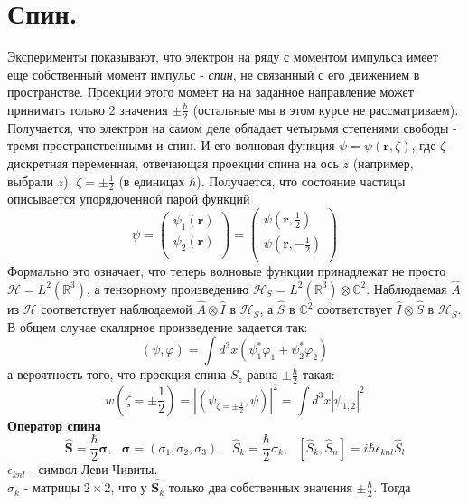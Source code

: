 \section{Спин.}
	Эксперименты показывают, что электрон на ряду с моментом импульса имеет еще собственный момент импульс - \textit{спин}, не связанный с его движением в пространстве. Проекции этого момент на на заданное направление может принимать только 2 значения $\pm\frac{\hbar}{2}$ (остальные мы в этом курсе не рассматриваем). \\
	Получается, что электрон на самом деле обладает четырьмя степенями свободы - тремя пространственными и спин. И его волновая функция $\psi = \psi(\textbf{r}, \zeta)$, где $\zeta$ - дискретная переменная, отвечающая проекции спина на ось $z$ (например, выбрали $z$). $\zeta=\pm\frac{1}{2}$ (в единицах $\hbar$). Получается, что состояние частицы описывается упорядоченной парой функций
	$$
		\psi = \left( 
		\begin{array}{c}
			\psi_1(\textbf{r}) \\
			\psi_2(\textbf{r}) \\
		\end{array} 
		\right) = \left( 
		\begin{array}{c}
			\psi(\textbf{r}, \frac{1}{2}) \\
			\psi(\textbf{r}, -\frac{1}{2}) \\
		\end{array} \right) 
	$$
	Формально это означает, что теперь волновые функции принадлежат не просто $\mathcal{H}=L^2(\mathbb{R}^3)$, а тензорному произведению $\mathcal{H}_S = L^2(\mathbb{R}^3)\otimes\mathbb{C}^2$. Наблюдаемая $\hat{A}$ из $\mathcal{H}$ соответствует наблюдаемой $\hat{A}\otimes\hat{I}$ в $\mathcal{H}_S$, а $\hat{S}$ в $\mathbb{C}^2$ соответствует $\hat{I}\otimes\hat{S}$ в $\mathcal{H}_S$. В общем случае скалярное произведение задается так: 
	$$
		(\psi,\varphi) = \int d^3x (\psi_1^{*}\varphi_1 + \psi_2^{*}\varphi_2)
	$$
	а вероятность того, что проекция спина $S_z$ равна $\pm\frac{\hbar}{2}$ такая:
	$$
		w\left(\zeta = \pm\frac{1}{2}\right) = |(\psi_{\zeta=\pm\frac{1}{2}},\psi)|^2 = \int d^3x |\psi_{1,2}|^2
	$$
	\noindent\textbf{Оператор спина}\\
	$$	
		\hat{\textbf{S}} = \frac{\hbar}{2}\bm{\sigma}, \ \ \ \bm{\sigma} = (\sigma_1,\sigma_2,\sigma_3), \ \ \ \hat{S}_k = \frac{\hbar}{2}\sigma_k, \ \ \ [\hat{S}_k, \hat{S}_n] = i\hbar\epsilon_{knl}\hat{S}_l
	$$
	$\epsilon_{knl}$ - символ Леви-Чивиты.\\
	$\sigma_k$ - матрицы $2\times2$, что у $\hat{\textbf{S}_k}$ только два собственных значения $\pm\frac{\hbar}{2}$. Тогда
